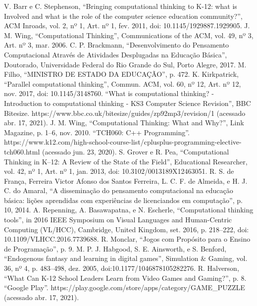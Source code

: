\documentclass[conference]{IEEEtran}
\begin{document}
\begin{thebibliography}{24}
 V. Barr e C. Stephenson, ``Bringing computational thinking to K-12: what is Involved and what is the role of the computer science education community?'', ACM Inroads, vol. 2, nº 1, Art. nº 1, fev. 2011, doi: 10.1145/1929887.1929905.
 J. M. Wing, ``Computational Thinking'', Communications of the ACM, vol. 49, nº 3, Art. nº 3, mar. 2006.
 C. P. Brackmann, ``Desenvolvimento do Pensamento Computacional Através de Atividades Desplugadas na Educação Básica'', Doutorado, Universidade Federal do Rio Grande do Sul, Porto Alegre, 2017.
 M. Filho, ``MINISTRO DE ESTADO DA EDUCAÇÃO'', p. 472.
 K. Kirkpatrick, ``Parallel computational thinking'', Commun. ACM, vol. 60, nº 12, Art. nº 12, nov. 2017, doi: 10.1145/3148760.
 ``What is computational thinking? - Introduction to computational thinking - KS3 Computer Science Revision'', BBC Bitesize. https://www.bbc.co.uk/bitesize/guides/zp92mp3/revision/1 (acessado abr. 17, 2021).
 J. M. Wing, ``Computational Thinking: What and Why?'', Link Magazine, p. 1–6, nov. 2010.
 ``TCH060: C++ Programming''. https://www.k12.com/high-school-course-list/cplusplus-programming-elective-tch060.html (acessado jun. 23, 2020).
 S. Grover e R. Pea, ``Computational Thinking in K–12: A Review of the State of the Field'', Educational Researcher, vol. 42, nº 1, Art. nº 1, jan. 2013, doi: 10.3102/0013189X12463051.
 R. S. de França, Ferreira Victor Afonso dos Santos Ferreira, L. C. F. de Almeida, e H. J. C. do Amaral, ``A disseminação do pensamento computacional na educação básica: lições aprendidas com experiências de licenciandos em computação'', p. 10, 2014.
 A. Repenning, A. Basawapatna, e N. Escherle, ``Computational thinking tools'', in 2016 IEEE Symposium on Visual Languages and Human-Centric Computing (VL/HCC), Cambridge, United Kingdom, set. 2016, p. 218–222, doi: 10.1109/VLHCC.2016.7739688.
 R. Monclar, ``Jogos com Propósito para o Ensino de Programação'', p. 9.
 M. P. J. Habgood, S. E. Ainsworth, e S. Benford, ``Endogenous fantasy and learning in digital games'', Simulation \& Gaming, vol. 36, nº 4, p. 483–498, dez. 2005, doi:10.1177/1046878105282276.
 R. Halverson, ``What Can K-12 School Leaders Learn from Video Games and Gaming?'', p. 8.
 ``Google Play''. https://play.google.com/store/apps/category/\linebreak GAME\_PUZZLE (acessado abr. 17, 2021).

\end{thebibliography}
\end{document}
